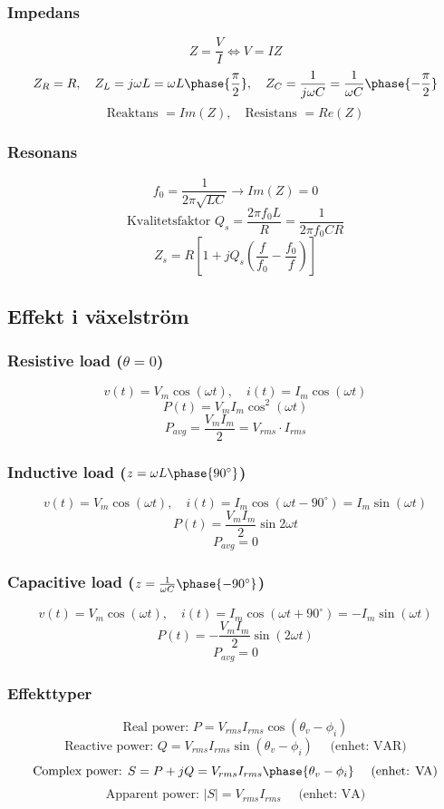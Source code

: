 \documentclass{article}
\begin{document}
\subsubsection{Impedans}
\[ Z = \frac{V}{I} \Leftrightarrow V = IZ \]
\[ Z_R = R, \quad Z_L = j \omega L = \omega L \phase{\frac{\pi}{2}}, \quad Z_C = \frac{1}{j \omega C} = \frac{1}{\omega C} \phase{-\frac{\pi}{2}} \]
\[ \textrm{Reaktans } = Im(Z), \quad \textrm{Resistans } = Re(Z) \]

\subsubsection{Resonans}
\[ f_0 = \frac{1}{2\pi \sqrt{LC}} \rightarrow Im(Z) = 0 \]
\[ \textrm{Kvalitetsfaktor } Q_s = \frac{2\pi f_0 L}{R} = \frac{1}{2\pi f_0 CR} \]
\[ Z_s = R \left[1 + j Q_s \left( \frac{f}{f_0} - \frac{f_0}{f} \right) \right] \]

\subsection{Effekt i växelström}

\subsubsection{Resistive load (\(\theta = 0 \))}
\[ v(t) = V_m \cos(\omega t), \quad i(t) = I_m \cos(\omega t) \]
\[ P(t) = V_m I_m \cos^2(\omega t) \]
\[ P_{avg} = \frac{V_m I_m}{2} = V_{rms} \cdot I_{rms} \]

\subsubsection{Inductive load (\(z = \omega L \phase{90^\circ} \))}
\[ v(t) = V_m \cos(\omega t), \quad i(t) = I_m \cos(\omega t - 90^\circ) = I_m \sin(\omega t) \]
\[ P(t) = \frac{V_m I_m}{2} \sin{2\omega t} \]
\[ P_{avg} = 0 \]

\subsubsection{Capacitive load (\(z = \frac{1}{\omega C} \phase{-90^\circ} \))}
\[ v(t) = V_m \cos(\omega t), \quad i(t) = I_m\cos(\omega t + 90^\circ) = -I_m \sin(\omega t) \]
\[ P(t) = -\frac{V_m I_m}{2} \sin(2 \omega t) \]
\[ P_{avg} = 0 \] 

\subsubsection{Effekttyper}
\[ \textrm{Real power: } P = V_{rms} I_{rms} \cos(\theta_v - \phi_i) \]
\[ \textrm{Reactive power: } Q = V_{rms} I_{rms}\sin(\theta_v - \phi_i) \quad \textrm{ (enhet: VAR)}\]
\[ \textrm{Complex power: } S = P + jQ = V_{rms}I_{rms}\phase{\theta_v - \phi_i} \quad \textrm{ (enhet: VA)} \]
\[ \textrm{Apparent power: } |S| = V_{rms}I_{rms} \quad \textrm{ (enhet: VA)} \]
\end{document}
